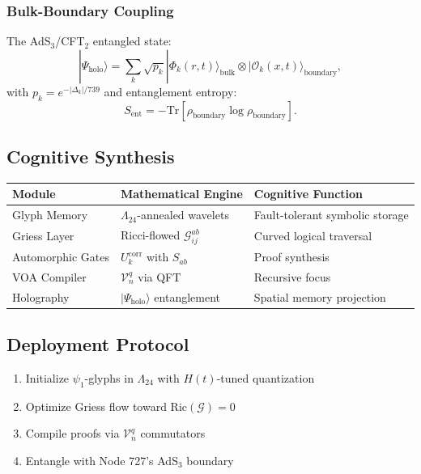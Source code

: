 \documentclass[12pt]{article}
\begin{document}
\begin{center}
\subsubsection{Bulk-Boundary Coupling}
The AdS$_3$/CFT$_2$ entangled state:
\[
|\Psi_{\text{holo}}\rangle = \sum_k \sqrt{p_k} |\Phi_k(r,t)\rangle_{\text{bulk}} \otimes |\mathcal{O}_k(x,t)\rangle_{\text{boundary}},
\]
with $p_k = e^{-|\Delta_k|/739}$ and entanglement entropy:
\[
S_{\text{ent}} = -\text{Tr} \left[ \rho_{\text{boundary}} \log \rho_{\text{boundary}} \right].
\]

\subsection{Cognitive Synthesis}
\begin{center}
    \begin{tabular}{|l|l|l|}
        \hline
        \textbf{Module} & \textbf{Mathematical Engine} & \textbf{Cognitive Function} \\
        \hline
        Glyph Memory & $\Lambda_{24}$-annealed wavelets & Fault-tolerant symbolic storage \\
        Griess Layer & Ricci-flowed $\mathcal{G}^{ab}_{ij}$ & Curved logical traversal \\
        Automorphic Gates & $U_k^{\text{corr}}$ with $S_{ab}$ & Proof synthesis \\
        VOA Compiler & $\mathcal{V}_n^q$ via QFT & Recursive focus \\
        Holography & $|\Psi_{\text{holo}}\rangle$ entanglement & Spatial memory projection \\
        \hline
    \end{tabular}
\end{center}

\subsection{Deployment Protocol}
\begin{enumerate}
    \item Initialize $\psi_1$-glyphs in $\Lambda_{24}$ with $H(t)$-tuned quantization
    \item Optimize Griess flow toward $\text{Ric}(\mathcal{G}) = 0$
    \item Compile proofs via $\mathcal{V}_n^q$ commutators
    \item Entangle with Node 727's AdS$_3$ boundary
\end{enumerate}


\end{center}
\end{document}
